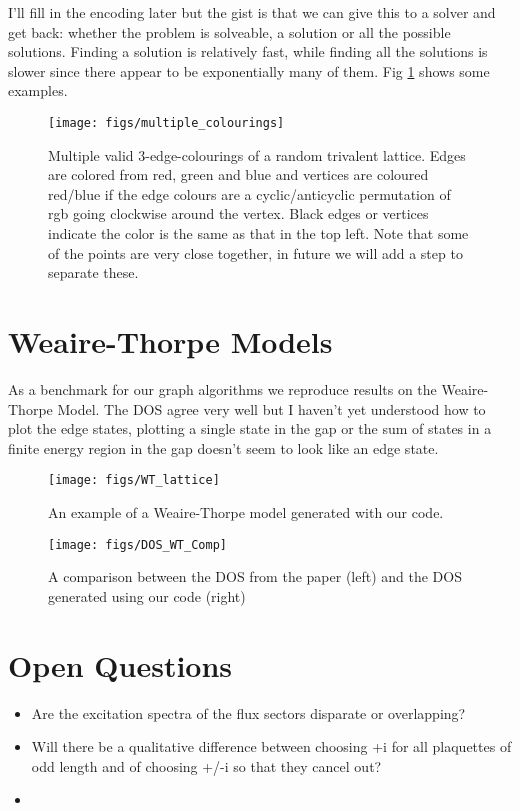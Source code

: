 I'll fill in the encoding later but the gist is that we can give this to a solver and get back: whether the problem is solveable, a solution or all the possible solutions. Finding a solution is relatively fast, while finding all the solutions is slower since there appear to be exponentially many of them. Fig \ref{fig:multiple_colourings} shows some examples. 


\begin{figure}
    \centering
    \texttt{[image: figs/multiple\_colourings]}
    \caption{Multiple valid 3-edge-colourings of a random trivalent lattice. Edges are colored from red, green and blue and vertices are coloured red/blue if the edge colours are a cyclic/anticyclic permutation of rgb going clockwise around the vertex. Black edges or vertices indicate the color is the same as that in the top left. Note that some of the points are very close together, in future we will add a step to separate these.}
    \label{fig:multiple_colourings}
\end{figure}


\section{Weaire-Thorpe Models}
As a benchmark for our graph algorithms we reproduce results on the Weaire-Thorpe Model. The DOS agree very well but I haven't yet understood how to plot the edge states, plotting a single state in the gap or the sum of states in a finite energy region in the gap doesn't seem to look like an edge state.



\begin{figure}
    \centering
    \texttt{[image: figs/WT\_lattice]}
    \caption{An example of a Weaire-Thorpe model generated with our code.}
    \label{fig:WT_lattice}
\end{figure}

\begin{figure}
    \centering
    \texttt{[image: figs/DOS\_WT\_Comp]}
    \caption{A comparison between the DOS from the paper (left) and the DOS generated using our code (right)}
    \label{fig:DOS_WT_Comp}
\end{figure}


\section{Open Questions}
\begin{itemize}
    \item Are the excitation spectra of the flux sectors disparate or overlapping?
    \item Will there be a qualitative difference between choosing +i for all plaquettes of odd length and of choosing +/-i so that they cancel out?
    \item
\end{itemize}

